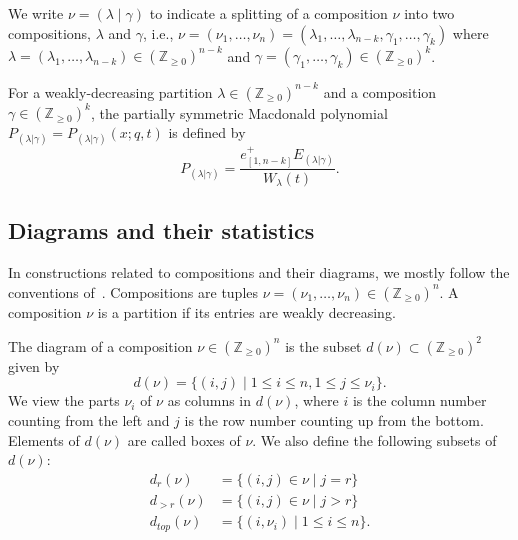 \documentclass[ALCO]{cedram}
\newcommand{\Z}{\mathbb{Z}}
\newcommand{\en}{e^+_{[1,n-k]}}
\newcommand{\dg}{d}
\begin{document}
We write $\nu = (\lambda \mid \gamma)$ to indicate a splitting of a composition $\nu$ into two compositions, $\lambda$ and $\gamma$, i.e., $\nu=(\nu_1,\dotsc,\nu_n)=(\lambda_1,\dotsc,\lambda_{n-k},\gamma_1,\dotsc,\gamma_k)$ where $\lambda=(\lambda_1,\dotsc,\lambda_{n-k})\in(\Z_{\ge 0})^{n-k}$ and $\gamma=(\gamma_1,\dotsc,\gamma_k)\in(\Z_{\ge 0})^k$.

\begin{defi}
For a weakly-decreasing partition $\lambda \in (\mathbb{Z}_{\geq 0})^{n-k}$ and a composition $\gamma\in (\Z_{\ge 0})^k$, the partially symmetric Macdonald polynomial $P_{(\lambda|\gamma)}=P_{(\lambda|\gamma)}(x;q,t)$ is defined by
\[
P_{(\lambda|\gamma)} = \frac{\en  E_{(\lambda|\gamma)}}{W_\lambda(t)}.
\]
\end{defi}





\subsection{Diagrams and their statistics}\label{diagrams} In constructions related to compositions and their diagrams, we mostly follow the conventions of~\cite{MR2405160}. Compositions are tuples $\nu=(\nu_1,\dotsc,\nu_n)\in(\Z_{\ge 0})^n$. A composition $\nu$ is a partition if its entries are weakly decreasing. 

The diagram of a composition $\nu\in(\Z_{\ge 0})^n$ is the subset $\dg(\nu)\subset (\Z_{\ge 0})^2$ given by
$$ \dg(\nu)=\{(i,j) \mid 1\le i\le n, 1\le j\le\nu_i\}. $$
We view the parts $\nu_i$ of $\nu$ as columns in $\dg(\nu)$, where $i$ is the column number counting from the left and $j$ is the row number counting up from the bottom. Elements of $\dg(\nu)$ are called boxes of $\nu$. We also define the following subsets of $\dg(\nu)$:
\begin{align*} 
\dg_r(\nu) &= \{(i,j) \in \nu \mid j=r \} \\
\dg_{>r}(\nu) &= \{(i,j) \in \nu \mid j>r\} \\
\dg_{top}(\nu) &= \{(i,\nu_i) \mid 1 \leq i \leq n\}.
\end{align*}
\end{document}
